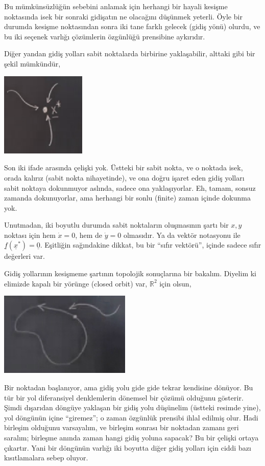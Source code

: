 \documentclass[12pt,fleqn]{article}\usepackage{../../common}
\begin{document}
Bu mümkünsüzlüğün sebebini anlamak için herhangi bir hayali kesişme noktasında
isek bir sonraki gidişatın ne olacağını düşünmek yeterli. Öyle bir durumda
kesişme noktasından sonra iki tane farklı gelecek (gidiş yönü) olurdu, ve bu iki
seçenek varlığı çözümlerin özgünlüğü prensibine aykırıdır.

Diğer yandan gidiş yolları sabit noktalarda birbirine yaklaşabilir, alttaki gibi
bir şekil mümkündür,

\includegraphics[height=4cm]{05_04.png}

Son iki ifade arasında çelişki yok. Üstteki bir sabit nokta, ve o noktada isek,
orada kalırız (sabit nokta nihayetinde), ve ona doğru işaret eden gidiş yolları
sabit noktaya dokunmuyor aslında, sadece ona yaklaşıyorlar. Eh, tamam, sonsuz
zamanda dokunuyorlar, ama herhangi bir sonlu (finite) zaman içinde dokunma yok.

Unutmadan, iki boyutlu durumda sabit noktaların oluşmasının şartı bir $x,y$
noktası için hem $\dot{x}=0$, hem de $\dot{y}=0$ olmasıdır. Ya da vektör
notasyonu ile $\underline{f}(\underline{x}^\ast)=\underline{0}$. Eşitliğin sağındakine
dikkat, bu bir ``sıfır vektörü'', içinde sadece sıfır değerleri var.

Gidiş yollarının kesişmeme şartının topolojik sonuçlarına bir bakalım. Diyelim
ki elimizde kapalı bir yörünge (closed orbit) var, $\mathbb{R}^2$ için olsun,

\includegraphics[height=4cm]{05_05.png}

Bir noktadan başlanıyor, ama gidiş yolu gide gide tekrar kendisine dönüyor. Bu
tür bir yol diferansiyel denklemlerin dönemsel bir çözümü olduğunu
gösterir. Şimdi dışarıdan döngüye yaklaşan bir gidiş yolu düşünelim (üstteki
resimde yine), yol döngünün içine ``giremez''; o zaman özgünlük prensibi ihlal
edilmiş olur. Hadi birleşim olduğunu varsayalım, ve birleşim sonrası bir
noktadan zamanı geri saralım; birleşme anında zaman hangi gidiş yoluna sapacak?
Bu bir çelişki ortaya çıkartır. Yani bir döngünün varlığı iki boyutta diğer
gidiş yolları için ciddi bazı kısıtlamalara sebep oluyor.
\end{document}
